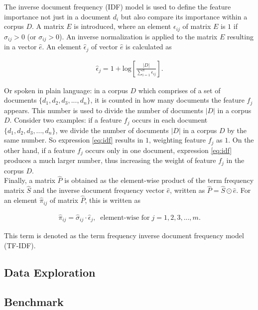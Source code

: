 \documentclass[a4paper,12pt,nottoc]{article}
\begin{document}
The inverse document frequency (IDF) model is used to define the feature importance not just in a document $d_i$ but also compare its importance within a corpus $D$. A matrix $E$ is introduced, where an element $\epsilon_{ij}$ of matrix $E$ is $1$ if $\hat{\sigma}_{ij} > 0$ (or $\sigma_{ij} > 0$). An inverse normalization is applied to the matrix $E$ resulting in a vector $\hat{e}$. An element $\hat{\epsilon}_{j}$ of vector $\hat{e}$ is calculated as

\begin{gather}\label{eq:idf}
\hat{\epsilon}_{j} = 1 + \textrm{log}\left[\frac{|D|}{\sum_{i=1}^{n}\epsilon_{ij}}\right].
\end{gather}

\noindent Or spoken in plain language: in a corpus $D$ which comprises of a set of documents $\{d_1, d_2, d_3, ..., d_n\}$, it is counted in how many documents the feature $f_j$ appears. This number is used to divide the number of documents $|D|$ in a corpus $D$. Consider two examples: if a feature $f_j$ occurs in each document $\{d_1, d_2, d_3, ..., d_n\}$, we divide the number of documents $|D|$ in a corpus $D$ by the same number. So expression \ref{eq:idf} results in $1$, weighting feature $f_j$ as $1$. On the other hand, if a feature $f_j$ occurs only in one document, expression \ref{eq:idf} produces a much larger number, thus increasing the weight of feature $f_j$ in the corpus $D$.\\

\noindent Finally, a matrix $\hat{P}$ is obtained as the element-wise product of the term frequency matrix $\hat{S}$ and the inverse document frequency vector $\hat{e}$, written as $\hat{P} = \hat{S} \odot \hat{e}$. For an element $\hat{\pi}_{ij}$ of matrix $\hat{P}$, this is written as

\begin{gather}
\hat{\pi}_{ij} = \hat{\sigma}_{ij} \cdot \hat{\epsilon}_{j},\;\;\textrm{element-wise for}\;j = 1, 2, 3, ..., m .
\end{gather}

\noindent This term is denoted as the term frequency inverse document frequency model (TF-IDF).

\subsection{Data Exploration}

\subsection{Benchmark}
\end{document}
